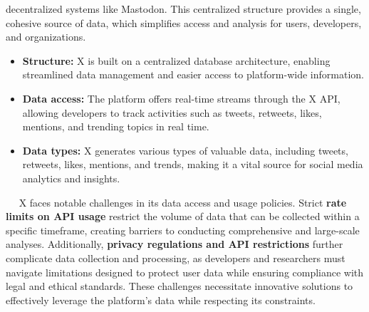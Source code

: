 \documentclass[12pt, a4paper]{article}
\begin{document}
            decentralized systems like Mastodon. This centralized structure
            provides a single, cohesive source of data, which simplifies access
            and analysis for users, developers, and organizations.
            \begin{itemize}
                \item \textbf{Structure:} X is built on a centralized database
                architecture, enabling streamlined data management and easier
                access to platform-wide information.
                \item \textbf{Data access:} The platform offers real-time
                streams through the X API, allowing developers to track
                activities such as tweets, retweets, likes, mentions, and
                trending topics in real time.
                \item \textbf{Data types:} X generates various types of valuable
                data, including tweets, retweets, likes, mentions, and trends,
                making it a vital source for social media analytics and
                insights.
            \end{itemize}
            $\quad$ X faces notable challenges in its data access and usage policies.
            Strict \textbf{rate limits on API usage} restrict the volume of data that
            can be collected within a specific timeframe, creating barriers to
            conducting comprehensive and large-scale analyses. Additionally,
            \textbf{privacy regulations and API restrictions} further complicate data
            collection and processing, as developers and researchers must
            navigate limitations designed to protect user data while ensuring
            compliance with legal and ethical standards. These challenges
            necessitate innovative solutions to effectively leverage the
            platform's data while respecting its constraints.
\end{document}
